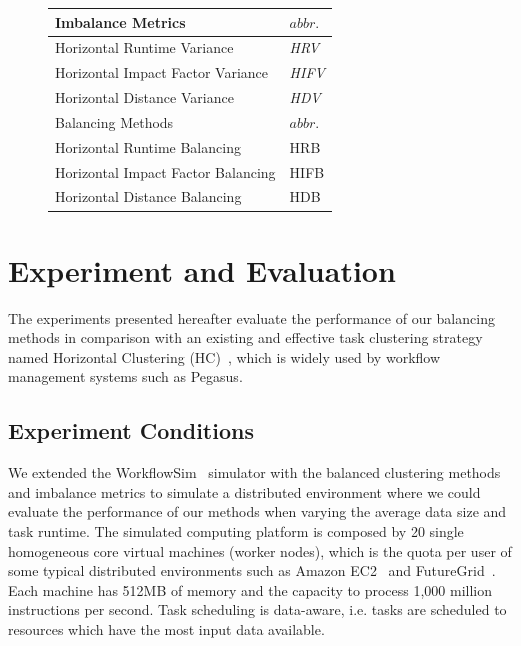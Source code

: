 \documentclass[final]{IEEEtran}
\begin{document}
\begin{figure}[htb]
	\centering
	\begin{tabular}{l|l}
		\hline
		Imbalance Metrics & $abbr.$   \\
		\hline
		Horizontal Runtime Variance & \emph{HRV}   \\ 
		Horizontal Impact Factor Variance & \emph{HIFV} \\ 
		Horizontal Distance Variance & \emph{HDV}  \\ 
		\hline
		Balancing Methods & $abbr.$  \\
		\hline
		Horizontal Runtime Balancing & HRB   \\ 
		Horizontal Impact Factor Balancing & HIFB\\ 
		Horizontal Distance Balancing & HDB \\ 
		\hline
	\end{tabular}
	\label{tab:2}
	\vspace{-10pt}
\end{figure}



\section{Experiment and Evaluation}
\label{sec:experiments}

The experiments presented hereafter evaluate the performance of our balancing methods in comparison with an existing and effective task clustering strategy named Horizontal Clustering (HC)~\cite{Singh:2008:WTC:1341811.1341822}, which is widely used by workflow management systems such as Pegasus. 

\subsection{Experiment Conditions}

We extended the WorkflowSim~\cite{WorkflowSim} simulator with the balanced clustering methods and imbalance metrics to simulate a distributed environment where we could evaluate the performance of our methods when varying the average data size and task runtime. The simulated computing platform is composed by 20 single homogeneous core virtual machines (worker nodes), which is the quota per user of some typical distributed environments such as Amazon EC2~\cite{AmazonAWS} and FutureGrid~\cite{FutureGrid}. Each machine has 512MB of memory and the capacity to process 1,000 million instructions per second. Task scheduling is data-aware, i.e. tasks are scheduled to resources which have the most input data available.
\end{document}
